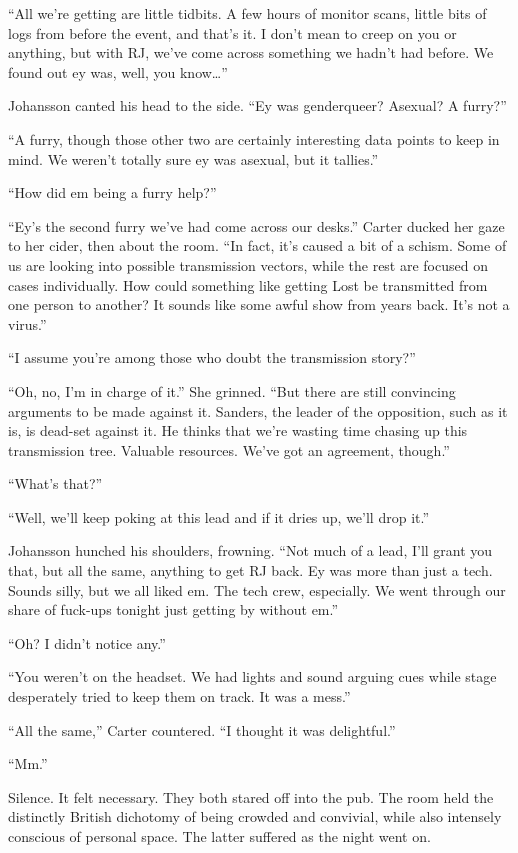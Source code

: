 ``All we're getting are little tidbits. A few hours of monitor scans, little bits of logs from before the event, and that's it. I don't mean to creep on you or anything, but with RJ, we've come across something we hadn't had before. We found out ey was, well, you know\ldots{}''

Johansson canted his head to the side. ``Ey was genderqueer? Asexual? A furry?''

``A furry, though those other two are certainly interesting data points to keep in mind. We weren't totally sure ey was asexual, but it tallies.''

``How did em being a furry help?''

``Ey's the second furry we've had come across our desks.'' Carter ducked her gaze to her cider, then about the room. ``In fact, it's caused a bit of a schism. Some of us are looking into possible transmission vectors, while the rest are focused on cases individually. How could something like getting Lost be transmitted from one person to another? It sounds like some awful show from years back. It's not a virus.''

``I assume you're among those who doubt the transmission story?''

``Oh, no, I'm in charge of it.'' She grinned. ``But there are still convincing arguments to be made against it. Sanders, the leader of the opposition, such as it is, is dead-set against it. He thinks that we're wasting time chasing up this transmission tree. Valuable resources. We've got an agreement, though.''

``What's that?''

``Well, we'll keep poking at this lead and if it dries up, we'll drop it.''

Johansson hunched his shoulders, frowning. ``Not much of a lead, I'll grant you that, but all the same, anything to get RJ back. Ey was more than just a tech. Sounds silly, but we all liked em. The tech crew, especially. We went through our share of fuck-ups tonight just getting by without em.''

``Oh? I didn't notice any.''

``You weren't on the headset. We had lights and sound arguing cues while stage desperately tried to keep them on track. It was a mess.''

``All the same,'' Carter countered. ``I thought it was delightful.''

``Mm.''

Silence. It felt necessary. They both stared off into the pub. The room held the distinctly British dichotomy of being crowded and convivial, while also intensely conscious of personal space. The latter suffered as the night went on.

